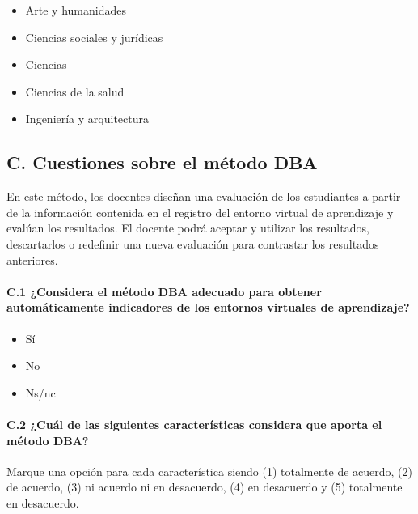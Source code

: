 \begin{mdframed}[style=cuestionarioST]
			\begin{itemize}
				\item Arte y humanidades
				\item Ciencias sociales y jurídicas
				\item Ciencias
				\item Ciencias de la salud
				\item Ingeniería y arquitectura
			\end{itemize}
\end{mdframed}

	
\newpage

	\subsection*{C. Cuestiones sobre el método DBA}

\begin{mdframed}[style=cuestionarioST]
	En este método, los docentes diseñan una evaluación de los estudiantes a partir de la información contenida en el registro del entorno virtual de aprendizaje y evalúan los resultados. El docente podrá aceptar y utilizar los resultados, descartarlos o redefinir una nueva evaluación para contrastar los resultados anteriores.
\end{mdframed}


	\paragraph*{C.1 ¿Considera el método DBA adecuado para obtener automáticamente indicadores de los entornos virtuales de aprendizaje?}

\begin{mdframed}[style=cuestionarioST]
			\begin{itemize}
				\item Sí
				\item No
				\item Ns/nc
			\end{itemize}
\end{mdframed}


	\paragraph*{C.2 ¿Cuál de las siguientes características considera que aporta el método DBA?}

Marque una opción para cada característica siendo (1) totalmente de acuerdo, (2) de acuerdo, (3) ni acuerdo ni en desacuerdo, (4) en desacuerdo y (5) totalmente en desacuerdo.

